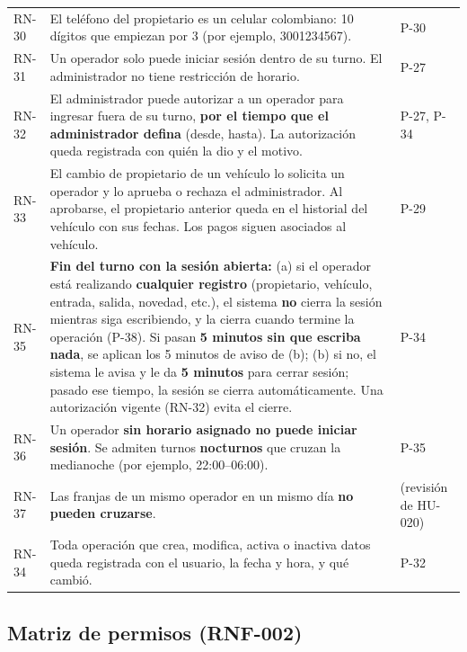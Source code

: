 \begin{longtable}{>{\raggedright\arraybackslash}p{2.6cm}>{\raggedright\arraybackslash}p{10.0cm}>{\raggedright\arraybackslash}p{1.8cm}}
RN-30 & El teléfono del propietario es un celular colombiano: 10 dígitos que empiezan por 3 (por ejemplo, 3001234567). & [U] P-30\\
RN-31 & Un operador solo puede iniciar sesión dentro de su turno. El administrador no tiene restricción de horario. & [U] P-27\\
RN-32 & El administrador puede autorizar a un operador para ingresar fuera de su turno, \textbf{por el tiempo que el administrador defina} (desde, hasta). La autorización queda registrada con quién la dio y el motivo. & [U] P-27, P-34\\
RN-33 & El cambio de propietario de un vehículo lo solicita un operador y lo aprueba o rechaza el administrador. Al aprobarse, el propietario anterior queda en el historial del vehículo con sus fechas. Los pagos siguen asociados al vehículo. & [U] P-29\\
RN-35 & \textbf{Fin del turno con la sesión abierta:} (a) si el operador está realizando \textbf{cualquier registro} (propietario, vehículo, entrada, salida, novedad, etc.), el sistema \textbf{no} cierra la sesión mientras siga escribiendo, y la cierra cuando termine la operación (P-38). Si pasan \textbf{5 minutos sin que escriba nada}, se aplican los 5 minutos de aviso de (b); (b) si no, el sistema le avisa y le da \textbf{5 minutos} para cerrar sesión; pasado ese tiempo, la sesión se cierra automáticamente. Una autorización vigente (RN-32) evita el cierre. & [U] P-34\\
RN-36 & Un operador \textbf{sin horario asignado no puede iniciar sesión}. Se admiten turnos \textbf{nocturnos} que cruzan la medianoche (por ejemplo, 22:00–06:00). & [U] P-35\\
RN-37 & Las franjas de un mismo operador en un mismo día \textbf{no pueden cruzarse}. & [U] (revisión de HU-020)\\
RN-34 & Toda operación que crea, modifica, activa o inactiva datos queda registrada con el usuario, la fecha y hora, y qué cambió. & [U] P-32\\
\bottomrule
\end{longtable}




\subsection{Matriz de permisos (RNF-002)}

